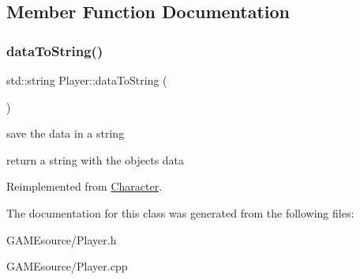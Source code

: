 \subsection{Member Function Documentation}
\mbox{\label{class_player_a3bd5a8ec31a4c46b09c4d9642e8d65ee}} 
\subsubsection{\texorpdfstring{data\+To\+String()}{dataToString()}}
{\footnotesize\ttfamily std\+::string Player\+::data\+To\+String (\begin{DoxyParamCaption}{ }\end{DoxyParamCaption})\hspace{0.3cm}{\ttfamily [virtual]}}



save the data in a string 

return a string with the object\textquotesingle{}s data 

Reimplemented from \mbox{\hyperlink{class_character_ad0d14b85124c5d0da611b2b925968277}{Character}}.



The documentation for this class was generated from the following files\+:\begin{DoxyCompactItemize}
\item 
G\+A\+M\+Esource/Player.\+h\item 
G\+A\+M\+Esource/Player.\+cpp\end{DoxyCompactItemize}
